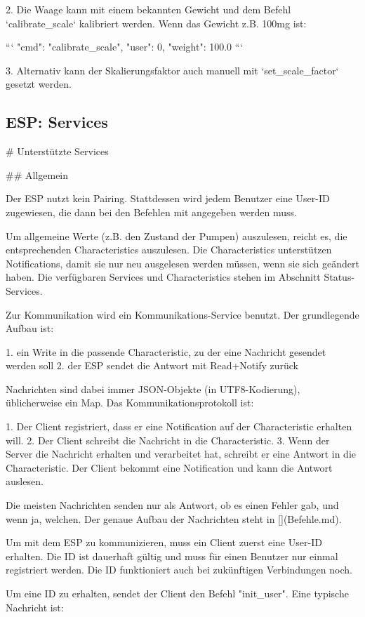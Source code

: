 2. Die Waage kann mit einem bekannten Gewicht und dem Befehl `calibrate_scale` kalibriert werden. Wenn das Gewicht z.B. 100mg ist:

```
{"cmd": "calibrate_scale", "user": 0, "weight": 100.0}
```

3. Alternativ kann der Skalierungsfaktor auch manuell mit `set_scale_factor` gesetzt werden.


\subsection{ESP: Services}
# Unterstützte Services

## Allgemein

Der ESP nutzt kein Pairing. Stattdessen wird jedem Benutzer eine User-ID zugewiesen, die dann bei den Befehlen mit angegeben werden muss.

Um allgemeine Werte (z.B. den Zustand der Pumpen) auszulesen, reicht es, die entsprechenden Characteristics auszulesen. Die Characteristics unterstützen Notifications, damit sie nur neu ausgelesen werden müssen, wenn sie sich geändert haben. Die verfügbaren Services und Characteristics stehen im Abschnitt Status-Services.

Zur Kommunikation wird ein Kommunikations-Service benutzt. Der grundlegende Aufbau ist:

1. ein Write in die passende Characteristic, zu der eine Nachricht gesendet werden soll
2. der ESP sendet die Antwort mit Read+Notify zurück

Nachrichten sind dabei immer JSON-Objekte (in UTF8-Kodierung), üblicherweise ein Map. Das Kommunikationsprotokoll ist:

1. Der Client registriert, dass er eine Notification auf der Characteristic erhalten will.
2. Der Client schreibt die Nachricht in die Characteristic.
3. Wenn der Server die Nachricht erhalten und verarbeitet hat, schreibt er eine Antwort in die Characteristic. Der Client bekommt eine Notification und kann die Antwort auslesen.

Die meisten Nachrichten senden nur als Antwort, ob es einen Fehler gab, und wenn ja, welchen. Der genaue Aufbau der Nachrichten steht in [](Befehle.md).

Um mit dem ESP zu kommunizieren, muss ein Client zuerst eine User-ID erhalten. Die ID ist dauerhaft gültig und muss für einen Benutzer nur einmal registriert werden. Die ID funktioniert auch bei zukünftigen Verbindungen noch.

Um eine ID zu erhalten, sendet der Client den Befehl "init_user". Eine typische Nachricht ist:

